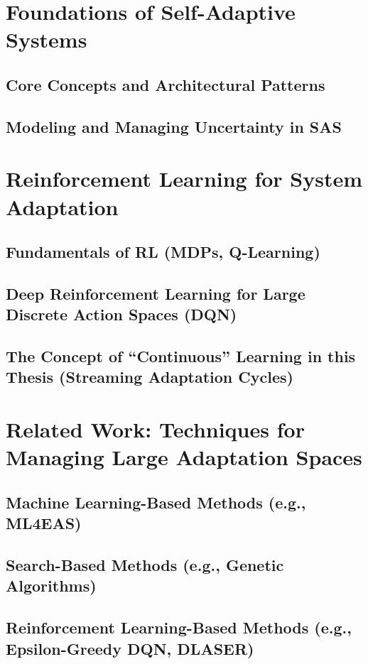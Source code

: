 \documentclass[11pt,a4paper]{article}
\begin{document}
\setcounter{section}{0}
\renewcommand{\thesection}{2.\arabic{section}}
\renewcommand{\thesubsection}{2.\arabic{section}.\arabic{subsection}}

\section{Foundations of Self-Adaptive Systems}
\subsection{Core Concepts and Architectural Patterns}
\subsection{Modeling and Managing Uncertainty in SAS}

\section{Reinforcement Learning for System Adaptation}
\subsection{Fundamentals of RL (MDPs, Q-Learning)}
\subsection{Deep Reinforcement Learning for Large Discrete Action Spaces (DQN)}
\subsection{The Concept of ``Continuous'' Learning in this Thesis (Streaming Adaptation Cycles)}

\section{Related Work: Techniques for Managing Large Adaptation Spaces}
\subsection{Machine Learning-Based Methods (e.g., ML4EAS)}
\subsection{Search-Based Methods (e.g., Genetic Algorithms)}
\subsection{Reinforcement Learning-Based Methods (e.g., Epsilon-Greedy DQN, DLASER)}
\end{document}
